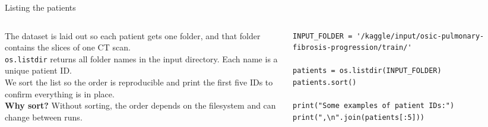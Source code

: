 \documentclass[10pt,aspectratio=169]{beamer}
\renewcommand{\section}[2][]{}
\begin{document}
\begin{frame}[fragile]{Listing the patients}
\begin{columns}[T,onlytextwidth]
\begin{column}{0.42\textwidth}
\small
The dataset is laid out so each patient gets one folder, and that folder contains the slices of one CT scan.\\[0.4em]
\texttt{os.listdir} returns all folder names in the input directory. Each name is a unique patient ID.\\[0.4em]
We sort the list so the order is reproducible and print the first five IDs to confirm everything is in place.\\[0.4em]
\textbf{Why sort?} Without sorting, the order depends on the filesystem and can change between runs.
\end{column}
\begin{column}{0.56\textwidth}
\begin{lstlisting}[firstnumber=last]
INPUT_FOLDER = '/kaggle/input/osic-pulmonary-fibrosis-progression/train/'

patients = os.listdir(INPUT_FOLDER)
patients.sort()

print("Some examples of patient IDs:")
print(",\n".join(patients[:5]))
\end{lstlisting}
\end{column}
\end{columns}
\end{frame}

\section{Reading a CT scan}
\end{document}
